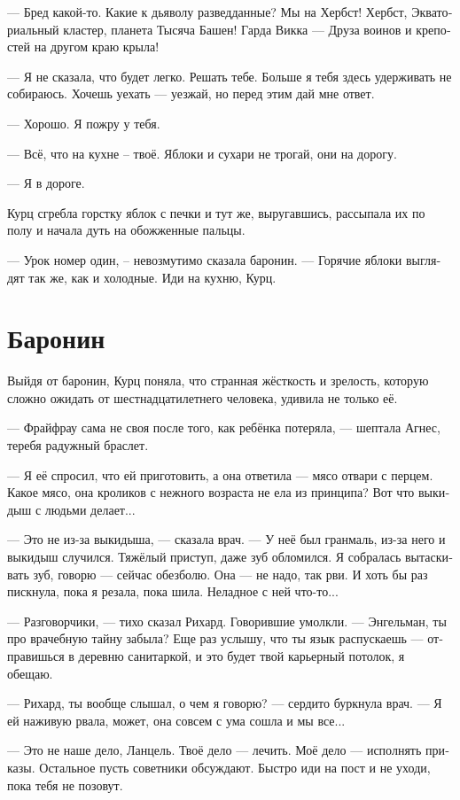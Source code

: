 \documentclass[a4paper,12pt,fleqn]{book}\usepackage{polyglossia}\setdefaultlanguage[babelshorthands=true]{russian}\setotherlanguage{english}\defaultfontfeatures{Ligatures=TeX,Mapping=tex-text}\usepackage{xcolor}\newcommand{\ml}[3]{#2}
\begin{document}
--- Бред какой-то.
Какие к дьяволу разведданные?
Мы на Хербст!
Хербст, Экваториальный кластер, планета Тысяча Башен!
Гарда Викка --- Друза воинов и крепостей на другом краю крыла!

--- Я не сказала, что будет легко.
Решать тебе.
Больше я тебя здесь удерживать не собираюсь.
Хочешь уехать --- уезжай, но перед этим дай мне ответ.

--- Хорошо.
Я пожру у тебя.

--- Всё, что на кухне -- твоё.
Яблоки и сухари не трогай, они на дорогу.

--- Я в дороге.

Курц сгребла горстку яблок с печки и тут же, выругавшись, рассыпала их по полу и начала дуть на обожженные пальцы.

--- Урок номер один, -- невозмутимо сказала баронин.
--- Горячие яблоки выглядят так же, как и холодные.
Иди на кухню, Курц.

\section{Баронин}

Выйдя от баронин, Курц поняла, что странная жёсткость и зрелость, которую сложно ожидать от шестнадцатилетнего человека, удивила не только её.

--- Фрайфрау сама не своя после того, как ребёнка потеряла, --- шептала Агнес, теребя радужный браслет.

--- Я её спросил, что ей приготовить, а она ответила --- мясо отвари с перцем.
Какое мясо, она кроликов с нежного возраста не ела из принципа?
Вот что выкидыш с людьми делает...

--- Это не из-за выкидыша, --- сказала врач.
--- У неё был гранмаль, из-за него и выкидыш случился.
Тяжёлый приступ, даже зуб обломился.
Я собралась вытаскивать зуб, говорю --- сейчас обезболю.
Она --- не надо, так рви.
И хоть бы раз пискнула, пока я резала, пока шила.
Неладное с ней что-то...

--- Разговорчики, --- тихо сказал Рихард.
Говорившие умолкли.
--- Энгельман, ты про врачебную тайну забыла?
Еще раз услышу, что ты язык распускаешь --- отправишься в деревню санитаркой, и это будет твой карьерный потолок, я обещаю.

--- Рихард, ты вообще слышал, о чем я говорю? --- сердито буркнула врач.
--- Я ей наживую рвала, может, она совсем с ума сошла и мы все...

--- Это не наше дело, Ланцель.
Твоё дело --- лечить.
Моё дело --- исполнять приказы.
Остальное пусть советники обсуждают.
Быстро иди на пост и не уходи, пока тебя не позовут.
\end{document}

